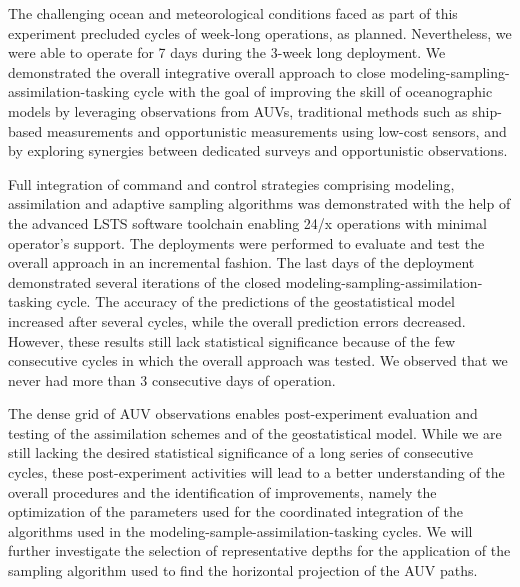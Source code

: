 The challenging ocean and meteorological conditions faced as part of
this experiment precluded cycles of week-long operations, as
planned. Nevertheless, we were able to operate for 7 days during the
3-week long deployment. We demonstrated the overall integrative
overall approach to close modeling-sampling-assimilation-tasking cycle
with the goal of improving the skill of oceanographic models by
leveraging observations from AUVs, traditional methods such as
ship-based measurements and opportunistic measurements using low-cost
sensors, and by exploring synergies between dedicated surveys and
opportunistic observations.

Full integration of command and control strategies comprising modeling,
assimilation and adaptive sampling algorithms was demonstrated with the
help of the advanced LSTS software toolchain enabling 24/x operations
with minimal operator’s support. The deployments were performed to
evaluate and test the overall approach in an incremental fashion. The
last days of the deployment demonstrated several iterations of the
closed modeling-sampling-assimilation-tasking cycle. The accuracy of the
predictions of the geostatistical model increased after several cycles,
while the overall prediction errors decreased. However, these results
still lack statistical significance because of the few consecutive
cycles in which the overall approach was tested. We observed that we
never had more than 3 consecutive days of operation.

The dense grid of AUV observations enables post-experiment evaluation
and testing of the assimilation schemes and of the geostatistical model.
While we are still lacking the desired statistical significance of a
long series of consecutive cycles, these post-experiment activities will
lead to a better understanding of the overall procedures and the
identification of improvements, namely the optimization of the
parameters used for the coordinated integration of the algorithms used
in the modeling-sample-assimilation-tasking cycles. We will further
investigate the selection of representative depths for the application
of the sampling algorithm used to find the horizontal projection of the
AUV paths.

